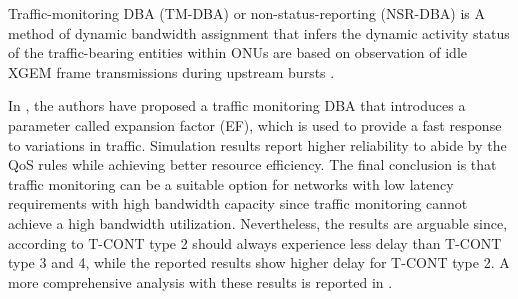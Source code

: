 Traffic-monitoring \ac{DBA} (TM-\ac{DBA}) or non-status-reporting (NSR-\ac{DBA}) is A method of dynamic bandwidth assignment that infers the dynamic activity status of the traffic-bearing entities within \acp{ONU} are based on observation of idle \ac{XGEM} frame transmissions during upstream bursts \cite{itu989}. 




In \cite{Ozimkiewicz:2010:DBA:1807993.1808031}, the authors have proposed a traffic monitoring \ac{DBA} that introduces a parameter called expansion factor (EF), which is used to provide a fast response to variations in traffic. %
Simulation results report higher reliability to abide by the \ac{QoS} rules while achieving better resource efficiency. The final conclusion is that traffic monitoring can be a suitable option for networks with low latency requirements with high bandwidth capacity since traffic monitoring cannot achieve a high bandwidth utilization. Nevertheless, the results are arguable since, according to \cite{itu989} \ac{T-CONT} type 2 should always experience less delay than \ac{T-CONT} type 3 and 4, while the reported results show higher delay for \ac{T-CONT} type 2. A more comprehensive analysis with these results is reported in \cite{323d2dc8bd804be2ad0887b4f1440384}.

